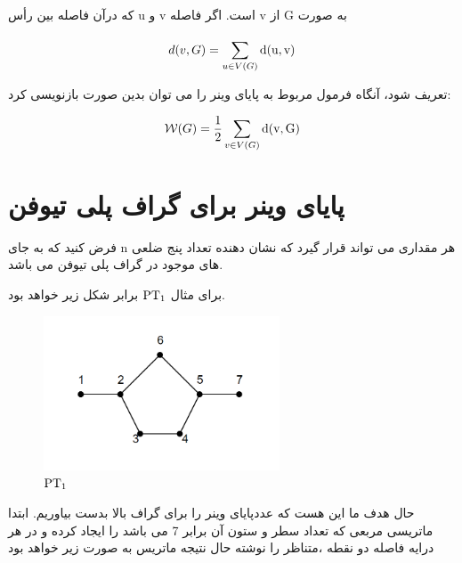 \documentclass[Persian]{cacna2023-fa}
\begin{document}
	که درآن  فاصله بین رأس u و v  است.
	اگر فاصله v از G  به صورت 

	
	\begin{equation}
		d(v, G)=\sum_{u  \in  V(G)}^{}\rm d(u, v)
	\end{equation}

	تعریف شود، آنگاه فرمول مربوط به پایای وینر را می توان بدین صورت 
	بازنویسی کرد:
	
	\begin{equation}
		\mathcal{W}(G) =\frac{1}{2} \sum_{v \in  V(G)} \rm d(v, G)
	\end{equation}


	


				\section{پایای وینر برای گراف پلی تیوفن}
				فرض کنید   که به جای 
				n هر مقداری می تواند قرار گیرد 
				که نشان دهنده تعداد پنج ضلعی های موجود در گراف
				پلی تیوفن می باشد.
				\begin{example}\label{ex1}
					برای مثال  ${\rm PT_1}$ برابر شکل زیر خواهد بود.
					
				\end{example}
				\begin{figure}[H]
					\includegraphics[width=7cm]{pt1.png}
					\caption{${\rm PT_1}$}
					\label{fig:pt1}
				  \end{figure}

				  حال هدف ما این هست که عددپایای وینر را برای گراف بالا بدست
				  بیاوریم. ابتدا ماتریسی 
				  مربعی که تعداد سطر و ستون آن برابر 7 می باشد را 
				  ایجاد کرده 
				  و در هر درایه فاصله دو نقطه 
				  ،متناظر را نوشته 
				  حال نتیجه ماتریس  به صورت زیر خواهد بود
				 
\end{document}
